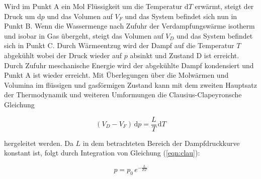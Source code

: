 \noindent
Wird im Punkt A ein Mol Flüssigkeit um die Temperatur d$T$ erwärmt,
steigt der Druck um d$p$ und das Volumen auf $V_F$
und das System befindet sich nun in Punkt B.
Wenn die Wassermenge nach Zufuhr der Verdampfungswärme isotherm und isobar in Gas übergeht,
steigt das Volumen auf $V_D$ und das System befindet sich in Punkt C.
Durch Wärmeentzug wird der Dampf auf die Temperatur $T$ abgekühlt wobei der Druck wieder auf $p$ absinkt
und Zustand D ist erreicht.
Durch Zufuhr meschanische Energie wird der abgekühlte Dampf kondensiert und
Punkt A ist wieder erreicht.
Mit Überlegungen über die Molwärmen und Volumina im flüssigen und gasförmigen Zustand
kann mit dem zweiten Hauptsatz der Thermodynamik
und weiteren Umformungen die Clausius-Clapeyronsche Gleichung 

\begin{equation}
(V_D - V_F) \, \text{d}p = \frac{L}{T} \, \text{d}T
\label{eqn:clau}
\end{equation}

\noindent
hergeleitet werden.
Da $L$ in dem betrachteten Bereich der Dampfdruckkurve konstant ist, 
folgt durch Integration von Gleichung (\ref{eqn:clau}):

\begin{equation}
p = p_0 \, e^{-\frac{L}{RT}}
\label{eqn:claui}
\end{equation}